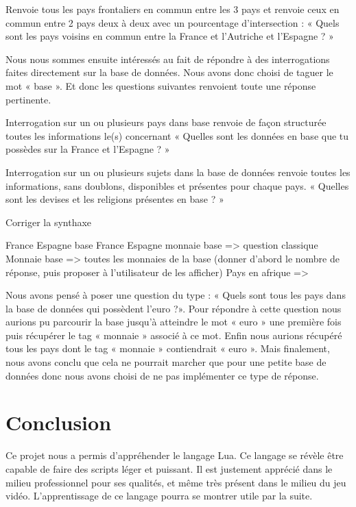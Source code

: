 \documentclass[11pt,a4paper]{article}
\begin{document}
Renvoie tous les pays frontaliers en commun entre les 3 pays et renvoie ceux en commun entre 2 pays deux à deux avec un pourcentage d’intersection :
« Quels sont les pays voisins en commun entre la France et l’Autriche et l’Espagne ? »
 
 
Nous nous sommes ensuite intéressés au fait de répondre à des interrogations faites directement sur la base de données. Nous avons donc choisi de taguer le mot « base ». Et donc les questions suivantes renvoient toute une réponse pertinente.
 
Interrogation sur un ou plusieurs pays dans base renvoie de façon structurée toutes les informations le(s) concernant
« Quelles sont les données en base que tu possèdes sur la France et l’Espagne ? »
 
Interrogation sur un ou plusieurs sujets dans la base de données renvoie toutes les informations, sans doublons, disponibles et présentes pour chaque pays.
« Quelles sont les devises et les religions présentes en base ? »
 
 
 
 
Corriger la synthaxe
 
France Espagne base
France Espagne monnaie base => question classique
Monnaie base => toutes les monnaies de la base  (donner d’abord le nombre de réponse, puis proposer à l’utilisateur de les afficher)
Pays en afrique =>
 
Nous avons pensé à poser une question du type : «  Quels sont tous les pays dans la base de données qui possèdent l’euro ?». Pour répondre à cette question nous aurions pu parcourir la base jusqu’à atteindre le mot « euro » une première fois puis  récupérer le tag « monnaie » associé à ce mot. Enfin nous aurions récupéré tous les pays dont le tag « monnaie » contiendrait « euro ». Mais finalement, nous avons conclu que cela ne pourrait marcher que pour une petite base de données donc nous avons choisi de ne pas implémenter ce type de réponse. 


\section{Conclusion}

Ce projet nous a permis d'appréhender le langage Lua. Ce langage se révèle être capable de faire des scripts léger et puissant. Il est justement apprécié dans le milieu professionnel pour ses qualités, et même très présent dans le milieu du jeu vidéo. L'apprentissage de ce langage pourra se montrer utile par la suite.
\end{document}

